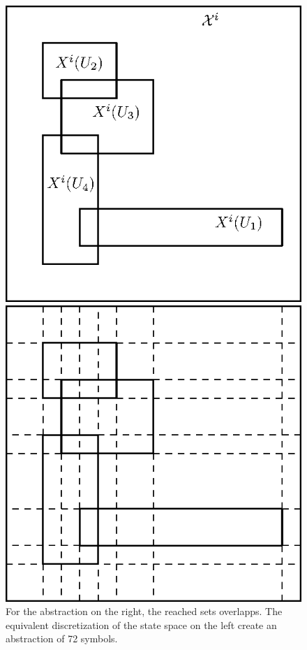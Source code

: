 \begin{figure}
\centering
\begin{minipage}[b]{0.49\textwidth}
	\includegraphics[width=\textwidth]{chapters/abstraction_reduction/overlapp_disc.eps}
\end{minipage}	
\begin{minipage}[b]{0.49\textwidth}
	\includegraphics[width=\textwidth]{chapters/abstraction_reduction/overlapp_disc2.eps}
\end{minipage}	
\caption{For the abstraction on the right, the reached sets overlapps. The equivalent discretization of the state space on the left create an abstraction of 72 symbols.}
\end{figure}

